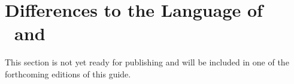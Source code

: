 \section{Differences to the Language of  \iclingo\ and \oclingo}\label{sec:iclingo:tri}

This section is not yet ready for publishing
and will be included in one of the forthcoming editions of this guide.


